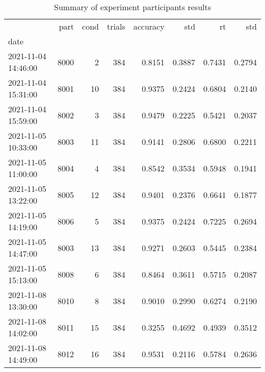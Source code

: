 \begin{table}
\centering
\caption{Summary of experiment participants results}
\label{table-subject-summary}
\begin{tabular}{lrrrrrrr}
\toprule
{} &  part & cond & trials & accuracy &    std &     rt &    std \\
date                &       &      &        &          &        &        &        \\
\midrule
2021-11-04 14:46:00 &  8000 &    2 &    384 &   0.8151 & 0.3887 & 0.7431 & 0.2794 \\
2021-11-04 15:31:00 &  8001 &   10 &    384 &   0.9375 & 0.2424 & 0.6804 & 0.2140 \\
2021-11-04 15:59:00 &  8002 &    3 &    384 &   0.9479 & 0.2225 & 0.5421 & 0.2037 \\
2021-11-05 10:33:00 &  8003 &   11 &    384 &   0.9141 & 0.2806 & 0.6800 & 0.2211 \\
2021-11-05 11:00:00 &  8004 &    4 &    384 &   0.8542 & 0.3534 & 0.5948 & 0.1941 \\
2021-11-05 13:22:00 &  8005 &   12 &    384 &   0.9401 & 0.2376 & 0.6641 & 0.1877 \\
2021-11-05 14:19:00 &  8006 &    5 &    384 &   0.9375 & 0.2424 & 0.7225 & 0.2694 \\
2021-11-05 14:47:00 &  8003 &   13 &    384 &   0.9271 & 0.2603 & 0.5445 & 0.2384 \\
2021-11-05 15:13:00 &  8008 &    6 &    384 &   0.8464 & 0.3611 & 0.5715 & 0.2087 \\
2021-11-08 13:30:00 &  8010 &    8 &    384 &   0.9010 & 0.2990 & 0.6274 & 0.2190 \\
2021-11-08 14:02:00 &  8011 &   15 &    384 &   0.3255 & 0.4692 & 0.4939 & 0.3512 \\
2021-11-08 14:49:00 &  8012 &   16 &    384 &   0.9531 & 0.2116 & 0.5784 & 0.2636 \\
\bottomrule
\end{tabular}
\end{table}
